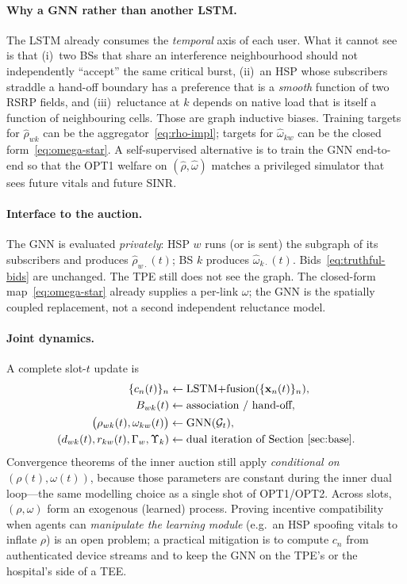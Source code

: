 \documentclass[journal,a4paper,10pt]{IEEEtran}
\begin{document}
\paragraph{Why a GNN rather than another LSTM.}
The LSTM already consumes the \emph{temporal} axis of each user. What it cannot see is that (i)~two BSs that share an interference neighbourhood should not independently ``accept'' the same critical burst, (ii)~an HSP whose subscribers straddle a hand-off boundary has a preference that is a \emph{smooth} function of two RSRP fields, and (iii)~reluctance at \(k\) depends on native load that is itself a function of neighbouring cells. Those are graph inductive biases. Training targets for \(\hat\rho_{wk}\) can be the aggregator~\eqref{eq:rho-impl}; targets for \(\hat\omega_{kw}\) can be the closed form~\eqref{eq:omega-star}. A self-supervised alternative is to train the GNN end-to-end so that the OPT1 welfare on \((\hat\rho,\hat\omega)\) matches a privileged simulator that sees future vitals and future SINR.

\paragraph{Interface to the auction.}
The GNN is evaluated \emph{privately}: HSP \(w\) runs (or is sent) the subgraph of its subscribers and produces \(\hat\rho_{w\cdot}(t)\); BS \(k\) produces \(\hat\omega_{k\cdot}(t)\). Bids~\eqref{eq:truthful-bids} are unchanged. The TPE still does not see the graph. The closed-form map~\eqref{eq:omega-star} already supplies a per-link \(\omega\); the GNN is the spatially coupled replacement, not a second independent reluctance model.

\paragraph{Joint dynamics.}
A complete slot-\(t\) update is
\begin{align}
  \{c_n(t)\}_n
    &\leftarrow \mathrm{LSTM{+}fusion}(\{\mathbf{x}_n(t)\}_n),
    \nonumber\\
  B_{wk}(t)
    &\leftarrow \text{association / hand-off},
    \nonumber\\
  \bigl(\rho_{wk}(t),\omega_{kw}(t)\bigr)
    &\leftarrow \mathrm{GNN}(\mathcal{G}_t),
    \label{eq:slot}\\
  (d_{wk}(t),r_{kw}(t),\Gamma_w,\Upsilon_k)
    &\leftarrow \text{dual iteration of Section~\ref{sec:base}}.
    \nonumber
\end{align}
Convergence theorems of the inner auction still apply \emph{conditional on} \((\rho(t),\omega(t))\), because those parameters are constant during the inner dual loop---the same modelling choice as a single shot of OPT1/OPT2. Across slots, \((\rho,\omega)\) form an exogenous (learned) process. Proving incentive compatibility when agents can \emph{manipulate the learning module} (e.g.\ an HSP spoofing vitals to inflate \(\rho\)) is an open problem; a practical mitigation is to compute \(c_n\) from authenticated device streams and to keep the GNN on the TPE's or the hospital's side of a TEE.
\end{document}
